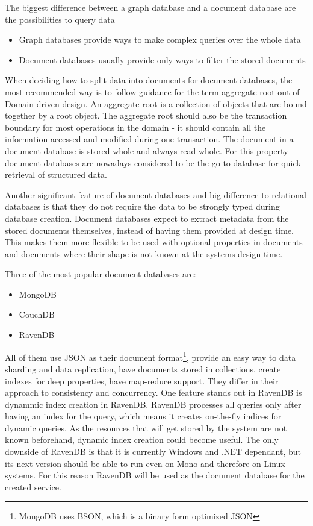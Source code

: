 The biggest difference between a graph database and a document database are the possibilities to query data 
\begin{itemize}
	\item Graph databases provide ways to make complex queries over the whole data
	\item Document databases usually provide only ways to filter the stored documents
\end{itemize}
When deciding how to split data into documents for document databases, the most recommended way is to follow guidance for the term aggregate root out of Domain-driven design\cite{onlineDomainDrivenDesign}. An aggregate root is a collection of objects that are bound together by a root object. The aggregate root should also be the transaction boundary for most operations in the domain - it should contain all the information accessed and modified during one transaction. The document in a document database is stored whole and always read whole. For this property document databases are nowadays considered to be the go to database for quick retrieval of structured data.

Another significant feature of document databases and big difference to relational databases is that they do not require the data to be strongly typed during database creation. Document databases expect to extract metadata from the stored documents themselves, instead of having them provided at design time. This makes them more flexible to be used with optional properties in documents and documents where their shape is not known at the systems design time. 

Three of the most popular document databases are\cite{onlineDocumentDBRanking}:
\begin{itemize}
	\item MongoDB\cite{onlineMongoDB}
	\item CouchDB\cite{onlineCouchDB}
	\item RavenDB\cite{onlineRavenDB}
\end{itemize}
All of them use JSON as their document format\footnote{MongoDB uses BSON, which is a binary form optimized JSON}, provide an easy way to data sharding and data replication, have documents stored in collections, create indexes for deep properties, have map-reduce support. They differ in their approach to consistency and concurrency. One feature stands out in RavenDB is dynammic index creation in RavenDB. RavenDB processes all queries only after having an index for the query, which means it creates on-the-fly indices for dynamic queries. As the resources that will get stored by the system are not known beforehand, dynamic index creation could become useful. The only downside of RavenDB is that it is currently Windows and .NET dependant, but its next version should be able to run even on Mono and therefore on Linux systems\cite{onlineRavenDBonLinux}.
For this reason RavenDB will be used as the document database for the created service.

